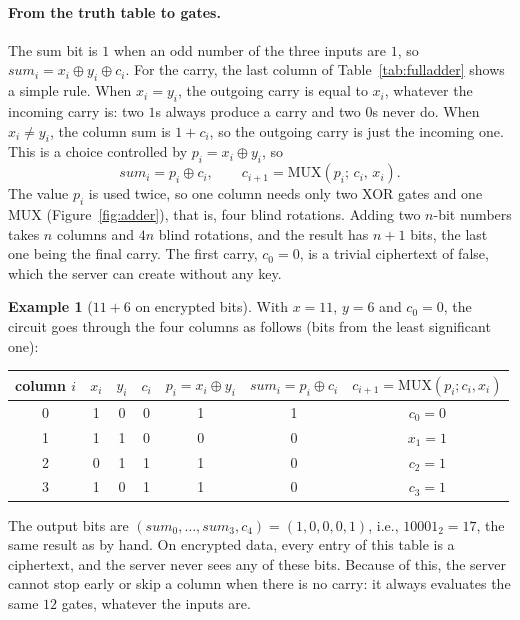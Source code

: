 \documentclass[12pt]{article}
\theoremstyle{plain}
\theoremstyle{definition}
\newtheorem{example}{Example}
\begin{document}
\paragraph{From the truth table to gates.}
The sum bit is $1$ when an odd number of the three inputs are $1$, so
$\mathit{sum}_i=x_i\oplus y_i\oplus c_i$. For the carry, the last column of
Table~\ref{tab:fulladder} shows a simple rule. When $x_i=y_i$, the outgoing
carry is equal to $x_i$, whatever the incoming carry is: two $1$s always produce
a carry and two $0$s never do. When $x_i\ne y_i$, the column sum is $1+c_i$, so
the outgoing carry is just the incoming one. This is a choice controlled by
$p_i=x_i\oplus y_i$, so
\[
  \mathit{sum}_i=p_i\oplus c_i,\qquad c_{i+1}=\mathrm{MUX}(p_i;\,c_i,\,x_i).
\]
The value $p_i$ is used twice, so one column needs only two XOR gates and one
MUX (Figure~\ref{fig:adder}), that is, four blind rotations. Adding two $n$-bit
numbers takes $n$ columns and $4n$ blind rotations, and the result has $n+1$
bits, the last one being the final carry. The first carry, $c_0=0$, is a trivial
ciphertext of \textsf{false}, which the server can create without any key.



\begin{example}[$11+6$ on encrypted bits]
With $x=11$, $y=6$ and $c_0=0$, the circuit goes through the four columns as
follows (bits from the least significant one):
\begin{center}
\small
\begin{tabular}{@{}ccccccc@{}}
\toprule
column $i$ & $x_i$ & $y_i$ & $c_i$ & $p_i=x_i\oplus y_i$ & $\mathit{sum}_i=p_i\oplus c_i$
  & $c_{i+1}=\mathrm{MUX}(p_i;c_i,x_i)$\\
\midrule
0 & 1 & 0 & 0 & 1 & 1 & $c_0=0$\\
1 & 1 & 1 & 0 & 0 & 0 & $x_1=1$\\
2 & 0 & 1 & 1 & 1 & 0 & $c_2=1$\\
3 & 1 & 0 & 1 & 1 & 0 & $c_3=1$\\
\bottomrule
\end{tabular}
\end{center}
The output bits are $(\mathit{sum}_0,\dots,\mathit{sum}_3,c_4)=(1,0,0,0,1)$,
i.e., $10001_2=17$, the same result as by hand. On encrypted data, every entry of
this table is a ciphertext, and the server never sees any of these bits.
Because of this, the server cannot stop early or skip a column when there is
no carry: it always evaluates the same $12$ gates, whatever the inputs are.
\end{example}
\end{document}

